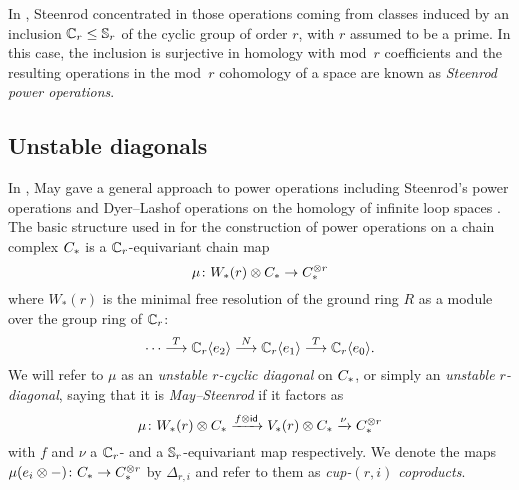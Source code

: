 In \cite{steenrod1953cyclic}, Steenrod concentrated in those operations coming from classes induced by an inclusion $\mathbb{C}_r \leq \mathbb{S}_r$ of the cyclic group of order $r$, with $r$ assumed to be a prime.
In this case, the inclusion is surjective in homology with mod~$r$ coefficients and the resulting operations in the mod~$r$ cohomology of a space are known as \textit{Steenrod power operations}.

\subsection{Unstable diagonals}

In \cite{may1970general}, May gave a general approach to power operations including Steenrod's power operations \cite{steenrod1962cohomology} and Dyer--Lashof operations on the homology of infinite loop spaces \cite{dyer62lashof}.
The basic structure used in \cite{may1970general} for the construction of power operations on a chain complex $C_{*}$ is a $\mathbb{C}_r$-equivariant chain map
\[
\mu \colon W_*(r) \otimes C_{*} \to C_{*}^{\otimes r}
\]
where $W_*(r)$ is the minimal free resolution of the ground ring $R$ as a module over the group ring of $\mathbb{C}_r$:
\[
\dotsb \overset{T}{\longrightarrow} \mathbb{C}_r\langle e_2\rangle \overset{N}{\longrightarrow}
\mathbb{C}_r\langle e_1\rangle \overset{T}{\longrightarrow}
\mathbb{C}_r\langle e_0\rangle.
\]
We will refer to $\mu$ as an \textit{unstable $r$-cyclic diagonal} on $C_{*}$, or simply an \textit{unstable $r$-diagonal}, saying that it is \textit{May--Steenrod} if it factors as
\[
\mu \colon W_*(r) \otimes C_{*} \xrightarrow{f \otimes \mathsf{id}} V_*(r) \otimes C_{*} \xrightarrow{\nu} C_{*}^{\otimes r}
\]
with $f$ and $\nu$ a $\mathbb{C}_r$- and a $\mathbb{S}_r$-equivariant map respectively.
We denote the maps $\mu(e_i \otimes -) \colon C_{*} \to C_{*}^{\otimes r}$ by $\Delta_{r,i}$ and refer to them as \textit{cup-$(r,i)$ coproducts}.


